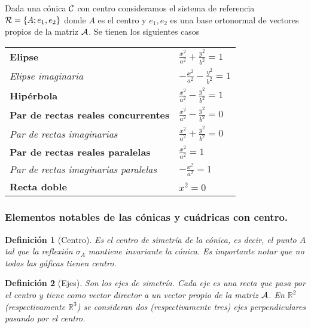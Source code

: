 \documentclass[11pt, a4paper, titlepage]{article}
\theoremstyle{theorem-style}
\theoremstyle{definition-style}
\newtheorem{ndef}{Definición}[section]
\theoremstyle{remark-style}
\theoremstyle{example-style}
\begin{document}
\vspace{.5cm}

Dada una c\'onica $\cal C$ con centro consideramos el sistema de referencia 
${\cal R}=\{A; e_1,e_2\}$ donde $A$ 
es el centro y $e_1,e_2$ es una base ortonormal de vectores propios de la matriz $\cal A$. Se tienen los siguientes casos

\vspace{.8cm}

\begin{tabular}{ll}
{\bf Elipse} \hspace{5cm} & 
$
\frac{{x}^2}{a^2} + \frac{{y}^2}{b^2} = 1
$
\vspace{.4cm}
\\
{\it Elipse imaginaria}  &
$
-\frac{{x}^2}{a^2} - \frac{{y}^2}{b^2} = 1
$
\vspace{.4cm}
\\
{\bf  Hip\'erbola}  &
$
\frac{{x}^2}{a^2} - \frac{{y}^2}{b^2} = 1
$
\vspace{.4cm}
\\
{\bf  Par de rectas reales concurrentes}  &
$
\frac{{x}^2}{a^2} - \frac{{y}^2}{b^2}=0
$
\vspace{.4cm}
\\
{\it Par de rectas imaginarias} &
$
\frac{{x}^2}{a^2} + \frac{{y}^2}{b^2}=0
$
\vspace{.4cm}
\\
{\bf  Par de rectas reales paralelas}  &
$
\frac{{x}^2}{a^2}=1
$
\vspace{.4cm}
\\
{\it Par de rectas imaginarias paralelas}  &
$
-\frac{{x}^2}{a^2} = 1
$
\vspace{.4cm}
\\
{\bf  Recta doble}  &
$
{{x}^2} = 0
$
\vspace{.3cm}
\\
\end{tabular}
\subsubsection{\bf  Elementos notables de las c\'onicas y cu\'adricas con centro.}

\begin{ndef}[Centro]
	Es el centro de simetría de la cónica, es decir, el punto $A$ tal que la reflexión $\sigma_A$ mantiene invariante la cónica. Es importante notar que no todas las gáficas tienen centro.
\end{ndef}


\begin{ndef}[Ejes]
	 Son los ejes de simetr\'ia. Cada eje es una recta que pasa por el centro y tiene como vector director a un vector propio de la matriz $\cal A$. En $\mathbb{R}^2$ (respectivamente $\mathbb{R}^3$) se consideran dos (respectivamente tres)  ejes perpendiculares pasando por el centro.
\end{ndef}
\end{document}
